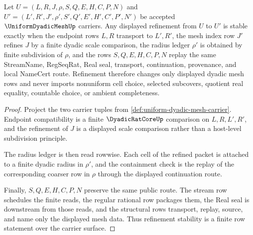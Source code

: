 \begin{theorem}
\label{thm:uniform-dyadic-mesh-refinement-stability}
Let $U=(L,R,J,\rho,S,Q,E,H,C,P,N)$ and $U'=(L',R',J',\rho',S',Q',E',H',C',P',N')$ be accepted $\UniformDyadicMeshUp$ carriers. Any displayed refinement from $U$ to $U'$ is stable exactly when the endpoint rows $L,R$ transport to $L',R'$, the mesh index row $J'$ refines $J$ by a finite dyadic scale comparison, the radius ledger $\rho'$ is obtained by finite subdivision of $\rho$, and the rows $S,Q,E,H,C,P,N$ replay the same StreamName, RegSeqRat, Real seal, transport, continuation, provenance, and local NameCert route. Refinement therefore changes only displayed dyadic mesh rows and never imports nonuniform cell choice, selected subcovers, quotient real equality, countable choice, or ambient completeness.
\end{theorem}
\begin{proof}
Project the two carrier tuples from \autoref{def:uniform-dyadic-mesh-carrier}. Endpoint compatibility is a finite $\DyadicRatCoreUp$ comparison on $L,R,L',R'$, and the refinement of $J$ is a displayed scale comparison rather than a host-level subdivision principle.

The radius ledger is then read rowwise. Each cell of the refined packet is attached to a finite dyadic radius in $\rho'$, and the containment check is the replay of the corresponding coarser row in $\rho$ through the displayed continuation route.

Finally, $S,Q,E,H,C,P,N$ preserve the same public route. The stream row schedules the finite reads, the regular rational row packages them, the Real seal is downstream from those reads, and the structural rows transport, replay, source, and name only the displayed mesh data. Thus refinement stability is a finite row statement over the carrier surface.
\end{proof}

